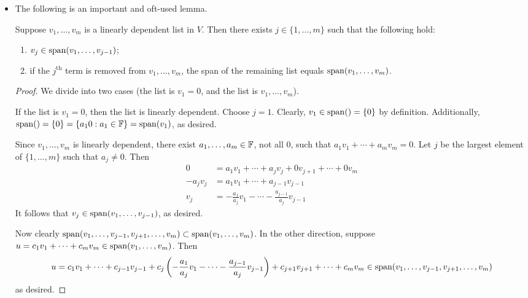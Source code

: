 \documentclass[../main.tex]{subfiles}
\begin{document}
\begin{itemize}
\begin{itemize}
    \end{itemize}
    \item The following is an important and oft-used lemma.
    \begin{lemma}\label{lem:linearDependenceLemma}
        Suppose $v_1,\dots,v_m$ is a linearly dependent list in $V$. Then there exists $j\in\{1,\dots,m\}$ such that the following hold:
        \begin{enumerate}[label={\textup{(}\alph*\textup{)}}]
            \item $v_j\in\operatorname{span}(v_1,\dots,v_{j-1})$;
            \item if the $j^\text{th}$ term is removed from $v_1,\dots,v_m$, the span of the remaining list equals $\operatorname{span}(v_1,\dots,v_m)$.
        \end{enumerate}
        \begin{proof}
            We divide into two cases (the list is $v_1=0$, and the list is $v_1,\dots,v_m$).\par\smallskip
            If the list is $v_1=0$, then the list is linearly dependent. Choose $j=1$. Clearly, $v_1\in\operatorname{span}()=\{0\}$ by definition. Additionally, $\operatorname{span}()=\{0\}=\{a_10:a_1\in\mathbb{F}\}=\operatorname{span}(v_1)$, as desired.\par\smallskip
            Since $v_1,\dots,v_m$ is linearly dependent, there exist $a_1,\dots,a_m\in\mathbb{F}$, not all 0, such that $a_1v_1+\cdots+a_mv_m=0$. Let $j$ be the largest element of $\{1,\dots,m\}$ such that $a_j\neq 0$. Then
            \begin{align*}
                0 &= a_1v_1+\cdots+a_jv_j+0v_{j+1}+\cdots+0v_m\\
                -a_jv_j &= a_1v_1+\cdots+a_{j-1}v_{j-1}\\
                v_j &= -\frac{a_1}{a_j}v_1-\cdots-\frac{a_{j-1}}{a_j}v_{j-1}
            \end{align*}
            It follows that $v_j\in\operatorname{span}(v_1,\dots,v_{j-1})$, as desired.\par
            Now clearly $\operatorname{span}(v_1,\dots,v_{j-1},v_{j+1},\dots,v_m)\subset\operatorname{span}(v_1,\dots,v_m)$. In the other direction, suppose $u=c_1v_1+\cdots+c_mv_m\in\operatorname{span}(v_1,\dots,v_m)$. Then
            \begin{equation*}
                u = c_1v_1+\cdots+c_{j-1}v_{j-1}+c_j\left( -\frac{a_1}{a_j}v_1-\cdots-\frac{a_{j-1}}{a_j}v_{j-1} \right)+c_{j+1}v_{j+1}+\cdots+c_mv_m\in\operatorname{span}(v_1,\dots,v_{j-1},v_{j+1},\dots,v_m)
            \end{equation*}
            as desired.
        \end{proof}

\end{lemma}
\end{itemize}
\end{document}
